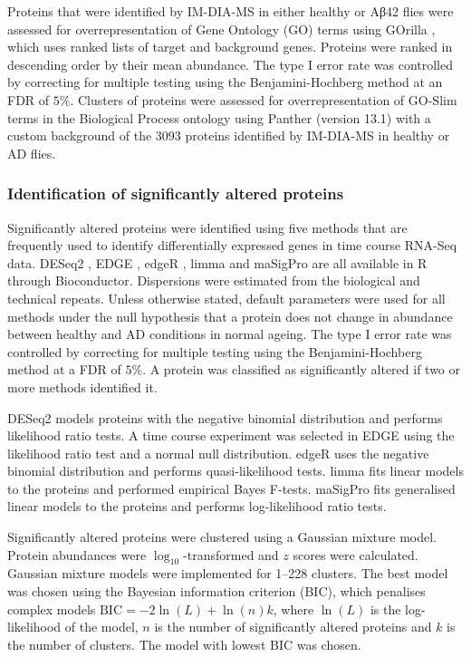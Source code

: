 Proteins that were identified by IM-DIA-MS in either healthy or Aβ42 flies were assessed for overrepresentation of Gene Ontology (GO) terms using GOrilla \cite{Bolstad2003}, which uses ranked lists of target and background genes.
Proteins were ranked in descending order by their mean abundance. The type I error rate was controlled by correcting for multiple testing using the Benjamini-Hochberg method at an FDR of $5\%$.
Clusters of proteins were assessed for overrepresentation of GO-Slim terms in the Biological Process ontology using Panther (version 13.1) with a custom background of the \num{3093} proteins identified by IM-DIA-MS in healthy or AD flies.

\subsubsection{Identification of significantly altered proteins}

Significantly altered proteins were identified using five methods that are frequently used to identify differentially expressed genes in time course RNA-Seq data.
DESeq2 \cite{Love2014}, EDGE \cite{Woo2011}, edgeR \cite{Robinson2010}, limma \cite{Ritchie2015} and maSigPro \cite{Nueda2014} are all available in R through Bioconductor.
Dispersions were estimated from the biological and technical repeats. Unless otherwise stated, default parameters were used for all methods under the null hypothesis that a protein does not change in abundance between healthy and AD conditions in normal ageing.
The type I error rate was controlled by correcting for multiple testing using the Benjamini-Hochberg method at a FDR of $5\%$.
A protein was classified as significantly altered if two or more methods identified it.

DESeq2 models proteins with the negative binomial distribution and performs likelihood ratio tests.
A time course experiment was selected in EDGE using the likelihood ratio test and a normal null distribution.
edgeR uses the negative binomial distribution and performs quasi-likelihood tests.
limma fits linear models to the proteins and performed empirical Bayes F-tests.
maSigPro fits generalised linear models to the proteins and performs log-likelihood ratio tests.

Significantly altered proteins were clustered using a Gaussian mixture model.
Protein abundances were $\log_{10}$-transformed and $z$ scores were calculated.
Gaussian mixture models were implemented for \numrange{1}{228} clusters.
The best model was chosen using the Bayesian information criterion (BIC), which penalises complex models $\text{BIC} = -2 \ln(L) + \ln(n)k$, where $\ln(L)$ is the log-likelihood of the model, $n$ is the number of significantly altered proteins and $k$ is the number of clusters.
The model with lowest BIC was chosen.

